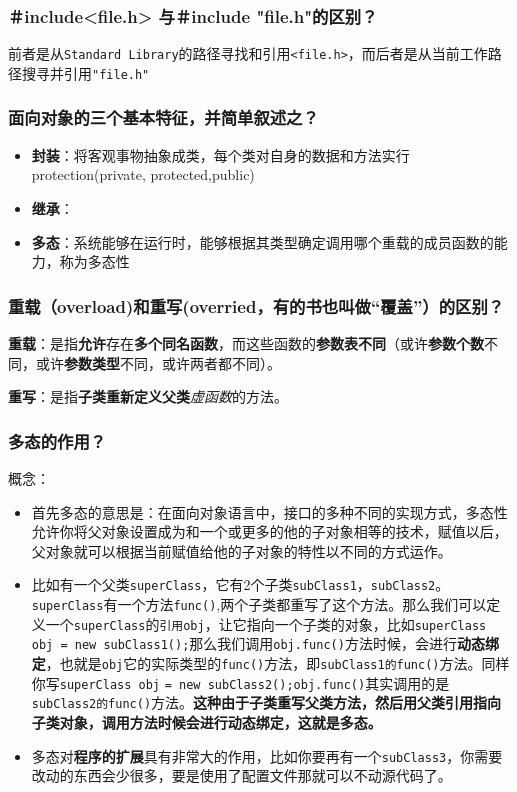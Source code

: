 \documentclass[UTF8,a4paper,8pt]{ctexart}
\begin{document}
		\subsubsection{＃include<file.h> 与＃include "file.h"的区别？}
			前者是从\verb|Standard Library|的路径寻找和引用\verb|<file.h>|，而后者是从当前工作路径搜寻并引用\verb|"file.h"|
			
		\subsubsection{面向对象的三个基本特征，并简单叙述之？}
			\begin{itemize}
				\item \textbf{封装}：将客观事物抽象成类，每个类对自身的数据和方法实行protection(private, protected,public)
				\item \textbf{继承}：
				\item \textbf{多态}：系统能够在运行时，能够根据其类型确定调用哪个重载的成员函数的能力，称为多态性
			\end{itemize}
		\subsubsection{重载（overload)和重写(overried，有的书也叫做“覆盖”）的区别？}
			\textbf{重载}：是指\textbf{允许}存在\textbf{多个同名函数}，而这些函数的\textbf{参数表不同}（或许\textbf{参数个数}不同，或许\textbf{参数类型}不同，或许两者都不同）。
			
			\textbf{重写}：是指\textbf{子类重新定义父类}\textit{虚函数}的方法。
		\subsubsection{多态的作用？}
			概念：
			\begin{itemize}[itemindent = 1em]
				\item 首先多态的意思是：在面向对象语言中，接口的多种不同的实现方式，多态性允许你将父对象设置成为和一个或更多的他的子对象相等的技术，赋值以后，父对象就可以根据当前赋值给他的子对象的特性以不同的方式运作。
				
				\item 比如有一个父类\verb|superClass|，它有2个子类\verb|subClass1|，\verb|subClass2|。\verb|superClass|有一个方法\verb|func()|,两个子类都重写了这个方法。那么我们可以定义一个\verb|superClass|的\verb|引用obj|，让它指向一个子类的对象，比如\verb|superClass| \verb|obj = new subClass1();|那么我们调用\verb|obj.func()|方法时候，会进行\textbf{动态绑定}，也就是\verb|obj|它的实际类型的\verb|func()|方法，即\verb|subClass1的func()|方法。同样你写\verb|superClass obj| \verb|= new subClass2();|\verb|obj.func()|其实调用的是\verb|subClass2的func()|方法。\textbf{这种由于子类重写父类方法，然后用父类引用指向子类对象，调用方法时候会进行动态绑定，这就是多态。}
				
				\item 多态对\textbf{程序的扩展}具有非常大的作用，比如你要再有一个\verb|subClass3|，你需要改动的东西会少很多，要是使用了配置文件那就可以不动源代码了。
			\end{itemize}
			
\end{document}
